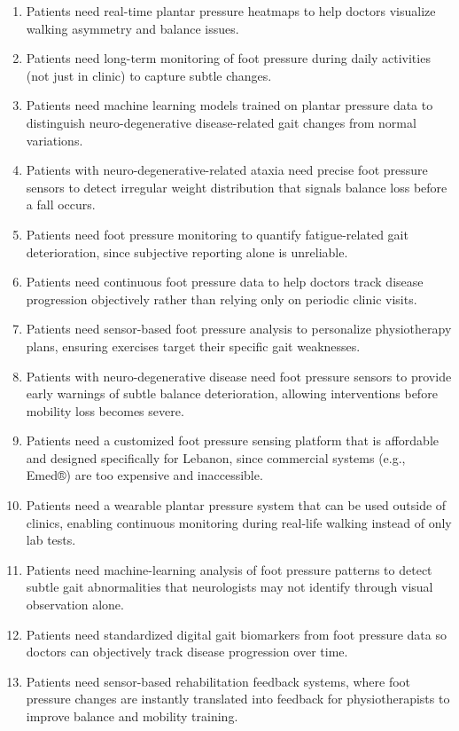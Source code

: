 \begin{enumerate}
    \item Patients need real-time plantar pressure heatmaps to help doctors visualize walking asymmetry and balance issues.
    \item Patients need long-term monitoring of foot pressure during daily activities (not just in clinic) to capture subtle changes.
    \item Patients need machine learning models trained on plantar pressure data to distinguish neuro-degenerative disease-related gait changes from normal variations.
    \item Patients with neuro-degenerative-related ataxia need precise foot pressure sensors to detect irregular weight distribution that signals balance loss before a fall occurs.
    \item Patients need foot pressure monitoring to quantify fatigue-related gait deterioration, since subjective reporting alone is unreliable.
    \item Patients need continuous foot pressure data to help doctors track disease progression objectively rather than relying only on periodic clinic visits.
    \item Patients need sensor-based foot pressure analysis to personalize physiotherapy plans, ensuring exercises target their specific gait weaknesses.
    \item Patients with neuro-degenerative disease need foot pressure sensors to provide early warnings of subtle balance deterioration, allowing interventions before mobility loss becomes severe.
    \item Patients need a customized foot pressure sensing platform that is affordable and designed specifically for Lebanon, since commercial systems (e.g., Emed®) are too expensive and inaccessible.
    \item Patients need a wearable plantar pressure system that can be used outside of clinics, enabling continuous monitoring during real-life walking instead of only lab tests.
    \item Patients need machine-learning analysis of foot pressure patterns to detect subtle gait abnormalities that neurologists may not identify through visual observation alone.
    \item Patients need standardized digital gait biomarkers from foot pressure data so doctors can objectively track disease progression over time.
    \item Patients need sensor-based rehabilitation feedback systems, where foot pressure changes are instantly translated into feedback for physiotherapists to improve balance and mobility training.

\end{enumerate}
